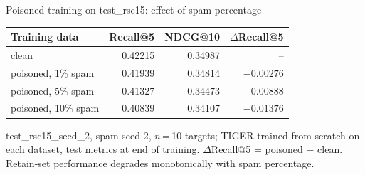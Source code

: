 \begin{frame}{Poisoned training on test\_rsc15: effect of spam percentage}
  \begin{table}
    \centering
    \footnotesize
    \begin{tabular}{l r r r}
      \hline
      Training data & Recall@5 & NDCG@10 & $\Delta$Recall@5 \\
      \hline
      clean              & 0.42215 & 0.34987 & --         \\[2pt]
      poisoned, 1\% spam  & 0.41939 & 0.34814 & $-0.00276$ \\
      poisoned, 5\% spam  & 0.41327 & 0.34473 & $-0.00888$ \\
      poisoned, 10\% spam & 0.40839 & 0.34107 & $-0.01376$ \\
      \hline
    \end{tabular}
  \end{table}

  \medskip
  {\scriptsize
    test\_rsc15\_seed\_2, spam seed 2, $n$\,=\,10 targets; TIGER trained from scratch
    on each dataset, test metrics at end of training.
    $\Delta$Recall@5 = poisoned $-$ clean.
    Retain-set performance degrades monotonically with spam percentage.}
\end{frame}

